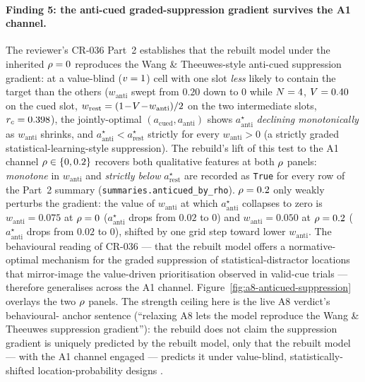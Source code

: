 \paragraph{Finding 5: the anti-cued graded-suppression gradient
survives the A1 channel.}
The reviewer's CR-036 Part~2 establishes that the rebuilt model
under the inherited $\rho = 0$ reproduces the Wang \&
Theeuwes-style anti-cued suppression gradient: at a value-blind
($v = 1$) cell with one slot \emph{less} likely to contain the
target than the others ($w_{\mathrm{anti}}$ swept from $0.20$ down to
$0$ while $N = 4$, $V = 0.40$ on the cued slot,
$w_{\mathrm{rest}} = (1\!-\!V\!-\!w_{\mathrm{anti}})/2$ on the
two intermediate slots, $r_c = 0.398$), the jointly-optimal
$(a_{\mathrm{cued}}, a_{\mathrm{anti}})$ shows $a_{\mathrm{anti}}^\star$
\emph{declining monotonically} as $w_{\mathrm{anti}}$ shrinks, and
$a_{\mathrm{anti}}^\star < a_{\mathrm{rest}}^\star$ strictly for every
$w_{\mathrm{anti}} > 0$ (a strictly graded statistical-learning-style
suppression). The rebuild's lift of this test to the A1 channel
$\rho \in \{0, 0.2\}$ recovers both qualitative features at both
$\rho$ panels: \emph{monotone} in $w_{\mathrm{anti}}$ and
\emph{strictly below} $a_{\mathrm{rest}}^\star$ are recorded as
\texttt{True} for every row of the Part~2 summary
(\texttt{summaries.anticued\_by\_rho}). $\rho = 0.2$ only weakly
perturbs the gradient: the value of $w_{\mathrm{anti}}$ at which
$a_{\mathrm{anti}}^\star$ collapses to zero is $w_{\mathrm{anti}} =
0.075$ at $\rho = 0$ ($a_{\mathrm{anti}}^\star$ drops from $0.02$ to
$0$) and $w_{\mathrm{anti}} = 0.050$ at $\rho = 0.2$
($a_{\mathrm{anti}}^\star$ drops from $0.02$ to $0$), shifted by one
grid step toward lower $w_{\mathrm{anti}}$. The behavioural reading
of CR-036 — that the rebuilt model offers a normative-optimal
mechanism for the graded suppression of statistical-distractor
locations that mirror-image the value-driven prioritisation observed
in valid-cue trials — therefore generalises across the A1 channel.
Figure~\ref{fig:a8-anticued-suppression} overlays the two $\rho$
panels. The strength ceiling here is the live A8 verdict's behavioural-
anchor sentence (``relaxing A8 lets the model reproduce the Wang \&
Theeuwes suppression gradient''): the rebuild does not claim the
suppression gradient is uniquely predicted by the rebuilt model, only
that the rebuilt model — with the A1 channel engaged — predicts it
under value-blind, statistically-shifted location-probability designs
\cite{wang_theeuwes2018_statistical_learning_distractor_suppression,failing_theeuwes2018_selection_history}.

